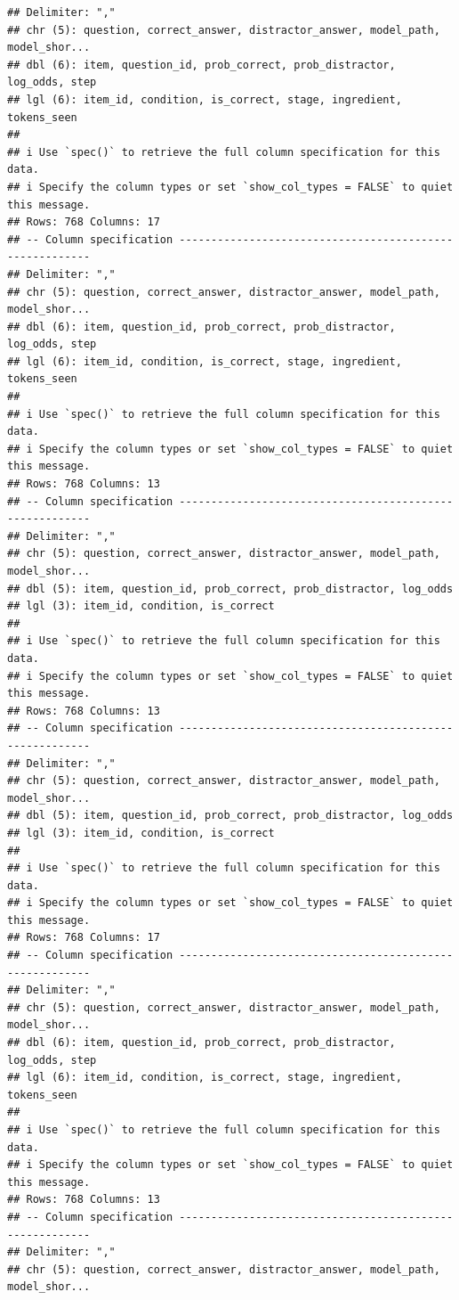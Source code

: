 \documentclass[
]{article}
\begin{document}
\begin{verbatim}
## Delimiter: ","
## chr (5): question, correct_answer, distractor_answer, model_path, model_shor...
## dbl (6): item, question_id, prob_correct, prob_distractor, log_odds, step
## lgl (6): item_id, condition, is_correct, stage, ingredient, tokens_seen
## 
## i Use `spec()` to retrieve the full column specification for this data.
## i Specify the column types or set `show_col_types = FALSE` to quiet this message.
## Rows: 768 Columns: 17
## -- Column specification --------------------------------------------------------
## Delimiter: ","
## chr (5): question, correct_answer, distractor_answer, model_path, model_shor...
## dbl (6): item, question_id, prob_correct, prob_distractor, log_odds, step
## lgl (6): item_id, condition, is_correct, stage, ingredient, tokens_seen
## 
## i Use `spec()` to retrieve the full column specification for this data.
## i Specify the column types or set `show_col_types = FALSE` to quiet this message.
## Rows: 768 Columns: 13
## -- Column specification --------------------------------------------------------
## Delimiter: ","
## chr (5): question, correct_answer, distractor_answer, model_path, model_shor...
## dbl (5): item, question_id, prob_correct, prob_distractor, log_odds
## lgl (3): item_id, condition, is_correct
## 
## i Use `spec()` to retrieve the full column specification for this data.
## i Specify the column types or set `show_col_types = FALSE` to quiet this message.
## Rows: 768 Columns: 13
## -- Column specification --------------------------------------------------------
## Delimiter: ","
## chr (5): question, correct_answer, distractor_answer, model_path, model_shor...
## dbl (5): item, question_id, prob_correct, prob_distractor, log_odds
## lgl (3): item_id, condition, is_correct
## 
## i Use `spec()` to retrieve the full column specification for this data.
## i Specify the column types or set `show_col_types = FALSE` to quiet this message.
## Rows: 768 Columns: 17
## -- Column specification --------------------------------------------------------
## Delimiter: ","
## chr (5): question, correct_answer, distractor_answer, model_path, model_shor...
## dbl (6): item, question_id, prob_correct, prob_distractor, log_odds, step
## lgl (6): item_id, condition, is_correct, stage, ingredient, tokens_seen
## 
## i Use `spec()` to retrieve the full column specification for this data.
## i Specify the column types or set `show_col_types = FALSE` to quiet this message.
## Rows: 768 Columns: 13
## -- Column specification --------------------------------------------------------
## Delimiter: ","
## chr (5): question, correct_answer, distractor_answer, model_path, model_shor...

\end{verbatim}
\end{document}
